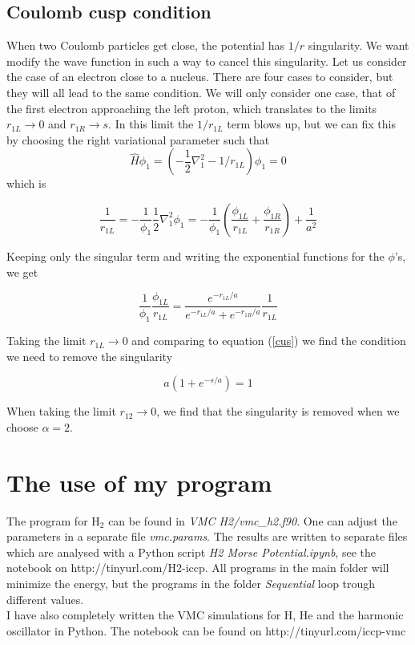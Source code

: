 \documentclass{article}
\begin{document}
\subsection{Coulomb cusp condition}
When two Coulomb particles get close, the potential has  $1/r$ singularity. We want modify the wave function in such a way to cancel this singularity. Let us consider the case of an electron close to a nucleus. There are four cases to consider, but they will all lead to the same condition. We will only consider one case, that of the first electron approaching the left proton, which translates to the limits $r_{1L} \rightarrow 0$ and $r_{1R} \rightarrow s$. In this limit the $1/r_{1L}$ term blows up, but we can fix this by choosing the right variational parameter such that
\begin{equation}
 \hat{H}\phi_1=(-\frac12\nabla_1^2-1/r_{1L})\phi_1=0
\end{equation}
which is 

\begin{equation}
\label{cus}
\frac{1}{r_{1L}}= - \frac{1}{\phi_1} \frac12 \nabla_1^2 \phi_1 = -\frac{1}{\phi_1} \left( \frac{\phi_{1L}}{r_{1L}} + \frac{\phi_{1R}}{r_{1R}}  \right) + \frac{1}{a^2}
\end{equation}

Keeping only the singular term and writing the exponential functions for the $\phi$'s, we get

\begin{equation}
 \frac{1}{\phi_1} \frac{\phi_{1L}}{r_{1L}}= \frac{e^{-r_{1L}/a}}{e^{-r_{1L}/a}+e^{-r_{1R}/a}}\frac{1}{r_{1L}}
\end{equation}

Taking the limit $r_{1L} \rightarrow 0$ and comparing to equation (\ref{cus}) we find the condition we need to remove the singularity

\begin{equation}
 a(1+e^{-s/a})=1
\end{equation}

When taking the limit $r_{12} \rightarrow 0$, we find that the singularity is removed when we choose $\alpha=2$.

\section{The use of my program}
The program for H$_2$ can be found in \emph{VMC H2/vmc\_h2.f90}. One can adjust the parameters in a separate file \emph{vmc.params}. The results are written to separate files which are analysed with a Python script \emph{H2 Morse Potential.ipynb}, see the notebook on http://tinyurl.com/H2-iccp. All programs in the main folder will minimize the energy, but the programs in the folder \emph{Sequential} loop trough different values.\\

I have also completely written the VMC simulations for H, He and the harmonic oscillator in Python. The notebook can be found on http://tinyurl.com/iccp-vmc
\end{document}
